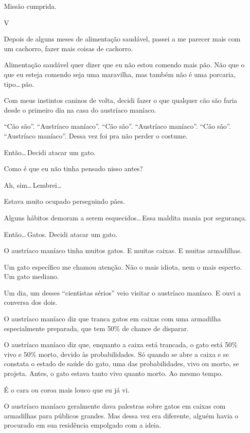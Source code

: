 Missão cumprida.

\begin{center}
{\Large V}
\end{center}

Depois de alguns meses de alimentação saudável, passei a me parecer mais com um cachorro, fazer mais coisas de cachorro.

Alimentação saudável quer dizer que eu não estou comendo mais pão. Não que o que eu esteja comendo seja uma maravilha, mas também não é uma porcaria, tipo\ldots\,pão.

Com meus instintos caninos de volta, decidi fazer o que qualquer cão são faria desde o primeiro dia na casa do austríaco maníaco.

``Cão são''. ``Austríaco maníaco''. ``Cão são''. ``Austríaco maníaco''. ``Cão são''. ``Austríaco maníaco''. Dessa vez foi pra não perder o costume.

Então\ldots\,Decidi atacar um gato.

Como é que eu não tinha pensado nisso antes?

Ah, sim\ldots\,Lembrei\ldots

Estava muito ocupado perseguindo pães.

Alguns hábitos demoram a serem esquecidos\ldots\,Essa maldita mania por segurança.

Então\ldots\,Gatos. Decidi atacar um gato.

O austríaco maníaco tinha muitos gatos. E muitas caixas. E muitas armadilhas.

Um gato específico me chamou atenção. Não o mais idiota, nem o mais esperto. Um gato mediano.

Um dia, um desses ``cientistas sérios'' veio visitar o austríaco maníaco. E ouvi a conversa dos dois.

O austríaco maníaco diz que tranca gatos em caixas com uma armadilha especialmente preparada, que tem 50\% de chance de disparar.

O austríaco maníaco diz que, enquanto a caixa está trancada, o gato está 50\% vivo e 50\% morto, devido às probabilidades. Só quando se abre a caixa e se constata o estado de saúde do gato, uma das probabilidades, vivo ou morto, se projeta. Antes, o gato estava tanto vivo quanto morto. Ao mesmo tempo.

É o cara ou coroa mais louco que eu já vi.

O austríaco maníaco geralmente dava palestras sobre gatos em caixas com armadilhas para públicos grandes. Mas dessa vez era diferente, alguém havia o procurado em sua residência empolgado com a ideia.

